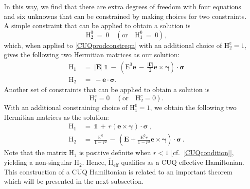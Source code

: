 \documentclass[12pt,a4paper]{article}
\begin{document}
In this way, we find that there are extra degrees of freedom with four equations and six unknowns that can be constrained by making choices for two constraints. A simple constraint that can be applied to obtain a solution is
\begin{equation}
    \mathrm{H}_2^0\: =\: 0 \quad (\text{or}\quad \mathrm{H}_1^0\: =\: 0),\label{CUQprodchoice1}
\end{equation}
which, when applied to \eqref{CUQprodconstreqn} with an additional choice of $\mathrm{H}_2^\mathrm{e}=1$, gives the following two Hermitian matrices as our solution:
\begin{equation}
    \begin{aligned}
        \mathrm{H}_1\ &=\ |\mathbf{E}|\,\mathbb{1}\: -\:\left(\mathrm{E}^0\mathbf{e}\,-\,\frac{|\boldsymbol{\Gamma}|}{2}\mathbf{e}\times\boldsymbol{\gamma}\right)\cdot\boldsymbol{\sigma}\\
        \mathrm{H}_2\ &=\ -\mathbf{e}\cdot\boldsymbol{\sigma}. 
    \end{aligned}\label{CUQprodchoiceres1}
\end{equation}
Another set of constraints that can be applied to obtain a solution is
\begin{equation}
    \mathrm{H}_1^e = 0\quad (\text{or} \quad \mathrm{H}_2^e = 0). \label{CUQprodchoice2}
\end{equation}
With an additional constraining choice of $\mathrm{H}_1^0 = 1$, we obtain the following two Hermitian matrices as the solution:
\begin{equation}
    \begin{aligned}
        \mathrm{H}_1\ &=\ \mathbb{1}\, +\, r(\mathbf{e}\times\boldsymbol{\gamma})\cdot\boldsymbol{\sigma}\,,\\
        \mathrm{H}_2\ &=\ \frac{\mathrm{E}^0}{1-r^2}\,-\,\left(\mathbf{E}+\frac{\mathrm{E^0}r}{1-r^2}\mathbf{e}\times\boldsymbol{\gamma}\right)\cdot\boldsymbol{\sigma}\,. 
    \end{aligned} \label{CUQprodchoiceres2}
\end{equation}
Note that the matrix $\mathrm{H}_1$ is positive definite when $r< 1$ [cf.~\eqref{CUQcondition}], yielding a non-singular $\mathrm{H}_2$. Hence,  $\widetilde{\mathrm{H}}_{\text{eff}}$ qualifies as a CUQ effective Hamiltonian. This construction of a CUQ Hamiltonian is related to an important theorem which will be presented in the next subsection.
\end{document}
